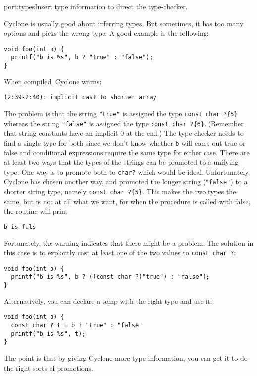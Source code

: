 \begin{porta}{port:types}{Insert type information to direct the type-checker.}

Cyclone is usually good about inferring types.  But sometimes, it
has too many options and picks the wrong type.  A good example is
the following:
\begin{verbatim}
void foo(int b) {
  printf("b is %s", b ? "true" : "false");
} 
\end{verbatim}
When compiled, Cyclone warns:
\begin{verbatim}
(2:39-2:40): implicit cast to shorter array
\end{verbatim}
The problem is that the string \texttt{"true"} is assigned the
type \texttt{const char ?\{5\}} whereas the string
\texttt{"false"} is assigned the type \texttt{const char ?\{6\}}.
(Remember that string constants have an implicit 0 at the end.)
The type-checker needs to find a single type for both since
we don't know whether \texttt{b} will come out true or false
and conditional expressions require the same type for either
case.  There are at least two ways that the types of the strings can be
promoted to a unifying type.  One way is to promote both
to \texttt{char?} which would be ideal.  Unfortunately, Cyclone
has chosen another way, and promoted the longer string
(\texttt{"false"}) to a shorter string type, namely
\texttt{const char ?\{5\}}.  This makes the two types the
same, but is not at all what we want, for when the procedure
is called with false, the routine will print
\begin{verbatim}
b is fals
\end{verbatim}
Fortunately, the warning indicates that there might be a problem.
The solution in this case is to explicitly cast at least one of the two
values to \texttt{const char ?}:
\begin{verbatim}
void foo(int b) {
  printf("b is %s", b ? ((const char ?)"true") : "false");
} 
\end{verbatim}
Alternatively, you can declare a temp with the right type and use
it:
\begin{verbatim}
void foo(int b) {
  const char ? t = b ? "true" : "false"
  printf("b is %s", t);
} 
\end{verbatim}
The point is that by giving Cyclone more type information, you can
get it to do the right sorts of promotions.  
\end{porta}

